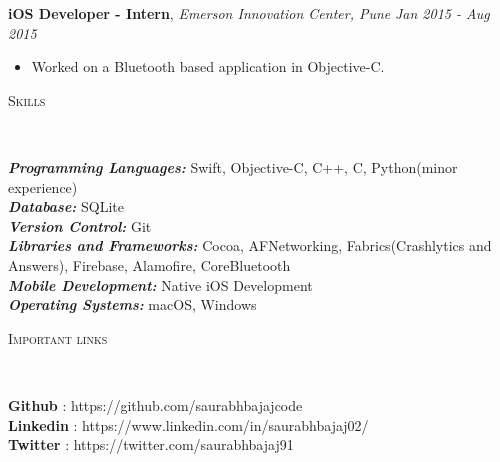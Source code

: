 \documentclass[9pt]{article}
\newenvironment{changemargin}[2]{%
  \begin{list}{}{%
    \setlength{\topsep}{0pt}%
    \setlength{\leftmargin}{#1}%
    \setlength{\rightmargin}{#2}%
    \setlength{\listparindent}{\parindent}%
    \setlength{\itemindent}{\parindent}%
    \setlength{\parsep}{\parskip}%
  }%
  \item[]}{\end{list}
}
\newcommand{\lineover}{
    \begin{changemargin}{-0.05in}{-0.05in}
        \vspace*{-8pt}
        \hrulefill \\
        \vspace*{-2pt}
    \end{changemargin}
}
\newcommand{\header}[1]{
    \begin{changemargin}{-0.5in}{-0.5in}
        \scshape{#1}\\
    \lineover
    \end{changemargin}
}
\newenvironment{body} {
    \vspace*{-16pt}
    \begin{changemargin}{-0.25in}{-0.5in}
  }
    {\end{changemargin}
}
\begin{document}
\begin{body}
    \vspace{14pt}
    \textbf{iOS Developer - Intern}, \emph{Emerson Innovation Center, Pune} \hfill \emph{Jan 2015 - Aug 2015}\\
    \vspace*{-4pt}
    \begin{itemize} \itemsep -0pt  %
        \item Worked on a Bluetooth based application in Objective-C.
    \end{itemize}

\end{body}

\smallskip


\header{Skills}

\begin{body}
    \vspace{14pt}
    \emph{\textbf{Programming Languages:}}{} Swift, Objective-C, C++, C, Python(minor experience)\\
    \emph{\textbf{Database:}}{} SQLite\\
    \emph{\textbf{Version Control:}}{} Git\\
    \emph{\textbf{Libraries and Frameworks:}}{} Cocoa, AFNetworking, Fabrics(Crashlytics and Answers), Firebase, Alamofire, CoreBluetooth \\
    \emph{\textbf{Mobile Development:}}{} Native iOS Development \\
    \emph{\textbf{Operating Systems:}}{} macOS, Windows\\
\end{body}

\smallskip


\header{Important links}

\begin{body}
    \vspace{14pt}
    \textbf{Github} : https://github.com/saurabhbajajcode \hfill{}\\
    \smallskip
    \textbf{Linkedin} : https://www.linkedin.com/in/saurabhbajaj02/ \hfill{}\\
    \smallskip
    \textbf{Twitter} : https://twitter.com/saurabhbajaj91 \hfill{}\\
\end{body}
\end{document}
